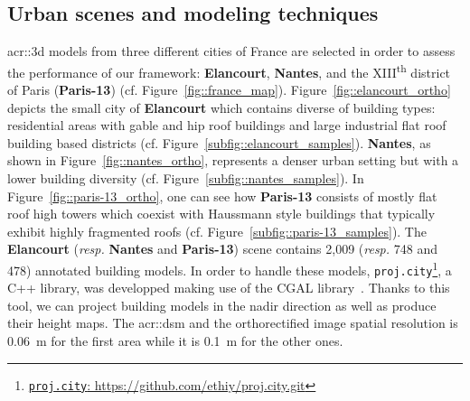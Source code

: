     \subsection{Urban scenes and modeling techniques}
        \label{subsec::experiments::datasets::scenes}        
        \gls{acr::3d} models from three different cities of France are selected in order to assess the performance of our framework: \textbf{Elancourt}, \textbf{Nantes}, and the XIII\textsuperscript{th} district of Paris (\textbf{Paris-13}) (cf. Figure~\ref{fig::france_map}).
        Figure~\ref{fig::elancourt_ortho} depicts the small city of \textbf{Elancourt} which contains diverse of building types: residential areas with gable and hip roof buildings and large industrial flat roof building based districts (cf. Figure~\ref{subfig::elancourt_samples}).
        \textbf{Nantes}, as shown in Figure~\ref{fig::nantes_ortho}, represents a denser urban setting but with a lower building diversity (cf. Figure~\ref{subfig::nantes_samples}).
        In Figure~\ref{fig::paris-13_ortho}, one can see how \textbf{Paris-13} consists of mostly flat roof high towers which coexist with Haussmann style buildings that typically exhibit highly fragmented roofs (cf. Figure~\ref{subfig::paris-13_samples}).
        The \textbf{Elancourt} (\textit{resp.} \textbf{Nantes} and \textbf{Paris-13}) scene contains 2,009 (\textit{resp.} 748 and 478) annotated building models.
        In order to handle these models, \verb!proj.city!\footnote{
            \href{https://github.com/ethiy/proj.city}{\verb!proj.city!: https://github.com/ethiy/proj.city.git}
        }, a C++ library, was developped making use of the CGAL library~\parencite{fabri2000design}.
        Thanks to this tool, we can project building models in the nadir direction as well as produce their height maps.
        The \gls{acr::dsm} and the orthorectified image spatial resolution is \SI{0.06}{\m} for the first area while it is \SI{0.1}{\m} for the other ones.\\

